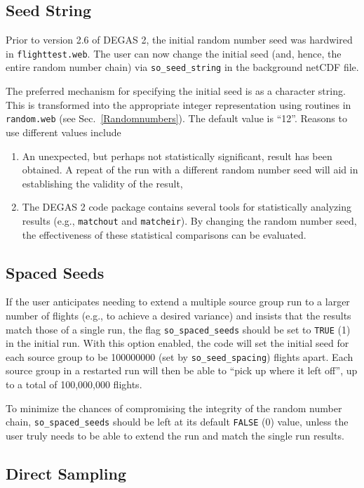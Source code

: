 \documentclass[12pt]{report}
\begin{document}
\subsection{Seed String}

Prior to version 2.6 of DEGAS 2, the initial random number seed was
hardwired in {\tt flighttest.web}. The user can now change the initial
seed (and, hence, the entire random number chain) via 
{\tt so\_seed\_string} in the background netCDF file. 

The preferred mechanism for specifying the initial seed is as a
character string. This is transformed into the appropriate integer
representation using routines in {\tt random.web} 
(see Sec.~\ref{Randomnumbers}). The default value is ``12''. Reasons
to use different values include
\begin{enumerate}
  \item An unexpected, but perhaps not statistically significant, result
has been obtained. A repeat of the run with a different random number
seed will aid in establishing the validity of the result,
  \item The DEGAS 2 code package contains several tools for 
statistically analyzing results (e.g., {\tt matchout} and
{\tt matcheir}). By changing the random number seed, the effectiveness of
these statistical comparisons can be evaluated.
\end{enumerate}

\subsection{Spaced Seeds}

If the user anticipates needing to extend a multiple source group run to
a larger number of flights (e.g., to achieve a desired variance) and 
insists that the results match those of a single run, the flag
{\tt so\_spaced\_seeds} should be set to {\tt TRUE} (1) in the initial 
run. With this option enabled, the code will set the initial seed
for each source group to be 100000000 (set by {\tt so\_seed\_spacing})
flights apart. Each source group
in a restarted run will then be able to ``pick up where it left off'',
up to a total of 100,000,000 flights.

To minimize the chances of compromising the integrity of the random
number chain, {\tt so\_spaced\_seeds} should be left at its default
{\tt FALSE} (0) value, unless the user truly needs to be able to extend
the run and match the single run results.

\subsection{Direct Sampling}
\end{document}
